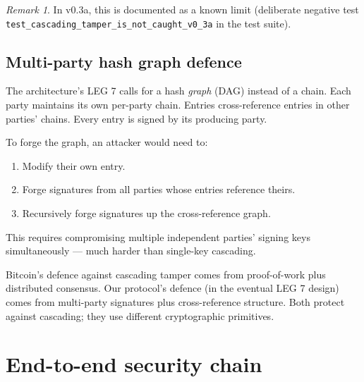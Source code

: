 \documentclass[11pt,a4paper]{article}
\theoremstyle{plain}
\theoremstyle{definition}
\theoremstyle{remark}
\newtheorem*{remark}{Remark}
\begin{document}
\begin{remark}
In v0.3a, this is documented as a known limit (deliberate negative test \texttt{test\_cascading\_tamper\_is\_not\_caught\_v0\_3a} in the test suite).
\end{remark}

\subsection{Multi-party hash graph defence}

The architecture's LEG 7 calls for a hash \emph{graph} (DAG) instead of a chain. Each party maintains its own per-party chain. Entries cross-reference entries in other parties' chains. Every entry is signed by its producing party.

To forge the graph, an attacker would need to:
\begin{enumerate}[itemsep=2pt,topsep=2pt]
  \item Modify their own entry.
  \item Forge signatures from all parties whose entries reference theirs.
  \item Recursively forge signatures up the cross-reference graph.
\end{enumerate}
This requires compromising multiple independent parties' signing keys simultaneously --- much harder than single-key cascading.

Bitcoin's defence against cascading tamper comes from proof-of-work plus distributed consensus. Our protocol's defence (in the eventual LEG 7 design) comes from multi-party signatures plus cross-reference structure. Both protect against cascading; they use different cryptographic primitives.

\section{End-to-end security chain}
\end{document}
